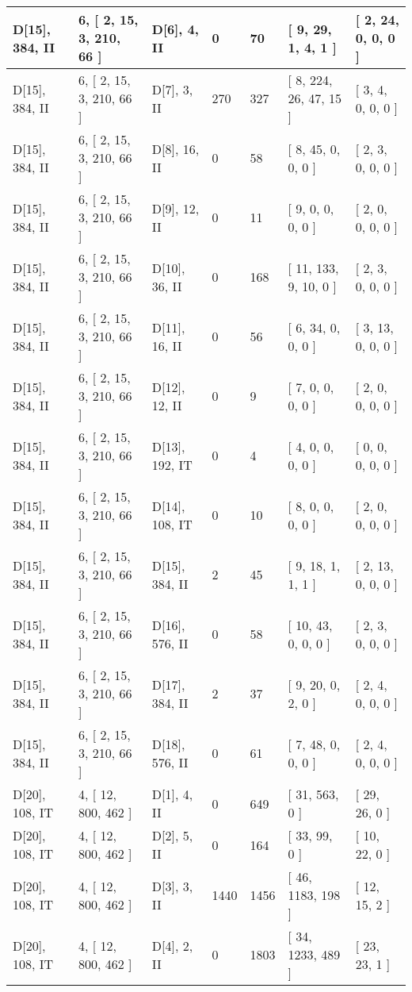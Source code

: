 \documentclass[9 pt]{scrartcl}
\begin{document}
\begin{longtable}{ |p{3em}|p{6em}|p{3em}|p{2em}|p{2em}|p{6em}|p{6em}| }
D[15], 384, II &6, [ 2, 15, 3, 210, 66 ] & D[6], 4, II  & 0 & 70 & [ 9, 29, 1, 4, 1 ] & [ 2, 24, 0, 0, 0 ]\\ \hline
D[15], 384, II &6, [ 2, 15, 3, 210, 66 ] & D[7], 3, II  & 270 & 327 & [ 8, 224, 26, 47, 15 ] & [ 3, 4, 0, 0, 0 ]\\ \hline
D[15], 384, II &6, [ 2, 15, 3, 210, 66 ] & D[8], 16, II  & 0 & 58 & [ 8, 45, 0, 0, 0 ] & [ 2, 3, 0, 0, 0 ]\\ \hline
D[15], 384, II &6, [ 2, 15, 3, 210, 66 ] & D[9], 12, II  & 0 & 11 & [ 9, 0, 0, 0, 0 ] & [ 2, 0, 0, 0, 0 ]\\ \hline
D[15], 384, II &6, [ 2, 15, 3, 210, 66 ] & D[10], 36, II  & 0 & 168 & [ 11, 133, 9, 10, 0 ] & [ 2, 3, 0, 0, 0 ]\\ \hline
D[15], 384, II &6, [ 2, 15, 3, 210, 66 ] & D[11], 16, II  & 0 & 56 & [ 6, 34, 0, 0, 0 ] & [ 3, 13, 0, 0, 0 ]\\ \hline
D[15], 384, II &6, [ 2, 15, 3, 210, 66 ] & D[12], 12, II  & 0 & 9 & [ 7, 0, 0, 0, 0 ] & [ 2, 0, 0, 0, 0 ]\\ \hline
D[15], 384, II &6, [ 2, 15, 3, 210, 66 ] & D[13], 192, IT  & 0 & 4 & [ 4, 0, 0, 0, 0 ] & [ 0, 0, 0, 0, 0 ]\\ \hline
D[15], 384, II &6, [ 2, 15, 3, 210, 66 ] & D[14], 108, IT  & 0 & 10 & [ 8, 0, 0, 0, 0 ] & [ 2, 0, 0, 0, 0 ]\\ \hline
D[15], 384, II &6, [ 2, 15, 3, 210, 66 ] & D[15], 384, II  & 2 & 45 & [ 9, 18, 1, 1, 1 ] & [ 2, 13, 0, 0, 0 ]\\ \hline
D[15], 384, II &6, [ 2, 15, 3, 210, 66 ] & D[16], 576, II  & 0 & 58 & [ 10, 43, 0, 0, 0 ] & [ 2, 3, 0, 0, 0 ]\\ \hline
D[15], 384, II &6, [ 2, 15, 3, 210, 66 ] & D[17], 384, II  & 2 & 37 & [ 9, 20, 0, 2, 0 ] & [ 2, 4, 0, 0, 0 ]\\ \hline
D[15], 384, II &6, [ 2, 15, 3, 210, 66 ] & D[18], 576, II  & 0 & 61 & [ 7, 48, 0, 0, 0 ] & [ 2, 4, 0, 0, 0 ]\\ \hline
D[20], 108, IT &4, [ 12, 800, 462 ] & D[1], 4, II  & 0 & 649 & [ 31, 563, 0 ] & [ 29, 26, 0 ]\\ \hline
D[20], 108, IT &4, [ 12, 800, 462 ] & D[2], 5, II  & 0 & 164 & [ 33, 99, 0 ] & [ 10, 22, 0 ]\\ \hline
D[20], 108, IT &4, [ 12, 800, 462 ] & D[3], 3, II  & 1440 & 1456 & [ 46, 1183, 198 ] & [ 12, 15, 2 ]\\ \hline
D[20], 108, IT &4, [ 12, 800, 462 ] & D[4], 2, II  & 0 & 1803 & [ 34, 1233, 489 ] & [ 23, 23, 1 ]\\ \hline

\end{longtable}
\end{document}
